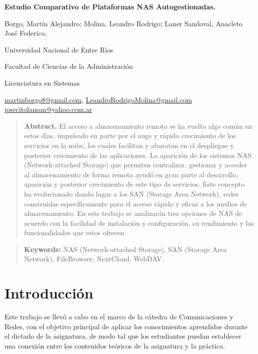 \documentclass[a4paper,10pt]{article}
\begin{document}
	\centering
	{\fontsize{14}{17}\bfseries Estudio Comparativo de Plataformas NAS Autogestionadas.\par}
	{\small Borgo, Martín Alejandro; Molina, Leandro Rodrigo; Laner Sandoval, Anacleto José Federico.\par}
	{\normalsize Universidad Nacional de Entre Ríos\par}
	{\normalsize Facultad de Ciencias de la Administración\par}
	{\normalsize Licenciatura en Sistemas\par}
	{\small
		\href{mailto:martinborgo8@gmail.com}{martinborgo8@gmail.com},
		\href{mailto:LeandroRodrigoMolina@gmail.com}{LeandroRodrigoMolina@gmail.com}
		\href{mailto:josecitolansan@yahoo.com.ar}{josecitolansan@yahoo.com.ar}
		\par}	
	{\begin{quote} \small \justify\textbf{Abstract.} El acceso a almacenamiento remoto se ha vuelto algo común en estos días, impulsado en parte por el auge y rápido crecimiento de los servicios en la nube, los cuales facilitan y abaratan en el despliegue y posterior crecimiento de las aplicaciones. La aparición de los sistemas NAS (Network-attached Storage) que permiten centralizar, gestionar y acceder al almacenamiento de forma remota ayudó en gran parte al desarrollo, aparición y posterior crecimiento de este tipo de servicios. Este concepto ha evolucionado dando lugar a los SAN (Storage Area Network), redes construidas específicamente para el acceso rápido y eficaz a los medios de almacenamiento. En este trabajo se analizarán tres opciones de NAS de acuerdo con la facilidad de instalación y configuración, su rendimiento y las funcionalidades que estos ofrecen. \end{quote} \par}
	{\begin{quote} \small \justify\textbf{Keywords:} NAS (Network-attached Storage), SAN (Storage Area Network), FileBrowser, NextCloud, WebDAV.\end{quote} \par}
	
	\justifying
	
	\section{Introducción}
	Este trabajo se llevó a cabo en el marco de la cátedra de Comunicaciones y Redes, con el objetivo principal de aplicar los conocimientos aprendidos durante el dictado de la asignatura, de modo tal que los estudiantes puedan establecer una conexión entre los contenidos teóricos de la asignatura y la práctica.
	
\end{document}
